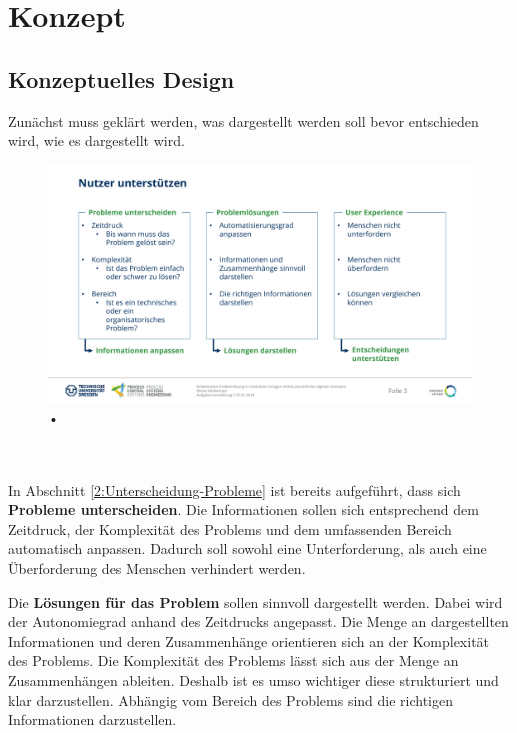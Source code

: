 \chapter{Konzept}
\label{sec:Konzept}


\section{Konzeptuelles Design}
Zunächst muss geklärt werden, was dargestellt werden soll bevor entschieden wird, wie es dargestellt wird.
\begin{figure}[htbp]
\centering
\includegraphics[scale=0.45]{DA_files/Bilder/Konzept/Nutzer-unterstuetzen.pdf}
\caption{•}
\label{pic:Nutzer-Unterstuetzen}
\end{figure}
\\ \\
In Abschnitt \ref{2:Unterscheidung-Probleme} ist bereits aufgeführt, dass sich \textbf{Probleme unterscheiden}. Die Informationen sollen sich entsprechend dem Zeitdruck, der Komplexität des Problems und dem umfassenden Bereich automatisch anpassen. Dadurch soll sowohl eine Unterforderung, als auch eine Überforderung des Menschen verhindert werden.

Die \textbf{Lösungen für das Problem} sollen sinnvoll dargestellt werden. Dabei wird der Autonomiegrad anhand des Zeitdrucks angepasst. Die Menge an dargestellten Informationen und deren Zusammenhänge orientieren sich an der Komplexität des Problems. Die Komplexität des Problems lässt sich aus der Menge an Zusammenhängen ableiten. Deshalb ist es umso wichtiger diese strukturiert und klar darzustellen. Abhängig vom Bereich des Problems sind die richtigen Informationen darzustellen.

